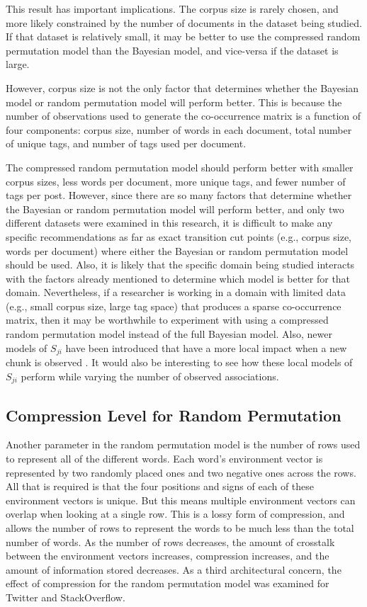 \documentclass[man,floatsintext,donotrepeattitle]{apa6}
\begin{document}
This result has important implications.
The corpus size is rarely chosen, and more likely constrained by the number of documents in the dataset being studied.
If that dataset is relatively small, it may be better to use the compressed random permutation model than the Bayesian model, and vice-versa if the dataset is large.

However, corpus size is not the only factor that determines whether the Bayesian model or random permutation model will perform better.
This is because the number of observations used to generate the co-occurrence matrix is a function of four components:
corpus size, number of words in each document, total number of unique tags, and number of tags used per document.

The compressed random permutation model should perform better with smaller corpus sizes, less words per document, more unique tags, and fewer number of tags per post.
However, since there are so many factors that determine whether the Bayesian or random permutation model will perform better,
and only two different datasets were examined in this research,
it is difficult to make any specific recommendations as far as exact transition cut points (e.g., corpus size, words per document) where either the Bayesian or random permutation model should be used.
Also, it is likely that the specific domain being studied interacts with the factors already mentioned to determine which model is better for that domain.
Nevertheless, if a researcher is working in a domain with limited data (e.g., small corpus size, large tag space) that produces a sparse co-occurrence matrix,
then it may be worthwhile to experiment with using a compressed random permutation model instead of the full Bayesian model.
Also, newer models of $S_{ji}$ have been introduced that have a more local impact when a new chunk is observed \parencite{thomson2013constraining}.
It would also be interesting to see how these local models of $S_{ji}$ perform while varying the number of observed associations.

\subsection{Compression Level for Random Permutation}

Another parameter in the random permutation model is the number of rows used to represent all of the different words.
Each word's environment vector is represented by two randomly placed ones and two negative ones across the rows.
All that is required is that the four positions and signs of each of these environment vectors is unique.
But this means multiple environment vectors can overlap when looking at a single row.
This is a lossy form of compression, and allows the number of rows to represent the words to be much less than the total number of words.
As the number of rows decreases, the amount of crosstalk between the environment vectors increases, compression increases, and the amount of information stored decreases.
As a third architectural concern, the effect of compression for the random permutation model was examined for Twitter and StackOverflow.
\end{document}
